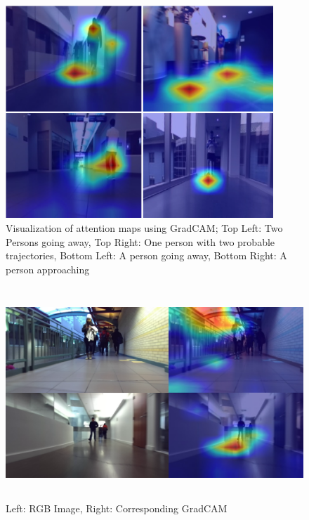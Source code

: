     \begin{figure}[ht]
      \centering
      \includegraphics[height=8cm, width=\columnwidth]{figs/grad_binary_class.png}
      \caption{Visualization of attention maps using GradCAM; Top Left: Two Persons going away, Top Right: One person with two probable trajectories, Bottom Left: A person going away, Bottom Right: A person approaching}
      \label{fig:gradcam1}
  \end{figure}

    \begin{figure}[ht]
      \centering
      \includegraphics[height=8cm, width=\columnwidth]{figs/gradCAM.pdf}
      \caption{Left: RGB Image, Right: Corresponding GradCAM}
      \label{fig:gradcam2}
  \end{figure}

